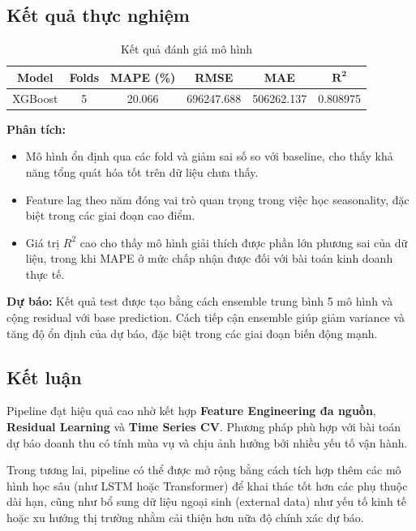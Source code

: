 \documentclass{article}
\begin{document}
\subsection{Kết quả thực nghiệm}

\begin{table}[h]
\centering
\renewcommand{\arraystretch}{1.3}
\setlength{\tabcolsep}{10pt}

\begin{tabular}{|c|c|c|c|c|c|}
\hline
\textbf{Model} & \textbf{ Folds } & \textbf{ MAPE (\%) } & \textbf{RMSE} & \textbf{MAE} & $\mathbf{R^2}$ \\
\hline
XGBoost & 5 & 20.066 & 696247.688 & 506262.137 & 0.808975 \\
\hline
\end{tabular}
\caption{Kết quả đánh giá mô hình}
\end{table}

\textbf{Phân tích:}
\begin{itemize}
    \item Mô hình ổn định qua các fold và giảm sai số so với baseline, cho thấy khả năng tổng quát hóa tốt trên dữ liệu chưa thấy.
    \item Feature lag theo năm đóng vai trò quan trọng trong việc học seasonality, đặc biệt trong các giai đoạn cao điểm.
    \item Giá trị $R^2$ cao cho thấy mô hình giải thích được phần lớn phương sai của dữ liệu, trong khi MAPE ở mức chấp nhận được đối với bài toán kinh doanh thực tế.
\end{itemize}

\textbf{Dự báo:} Kết quả test được tạo bằng cách ensemble trung bình 5 mô hình và cộng residual với base prediction. Cách tiếp cận ensemble giúp giảm variance và tăng độ ổn định của dự báo, đặc biệt trong các giai đoạn biến động mạnh.

\subsection{Kết luận}

Pipeline đạt hiệu quả cao nhờ kết hợp \textbf{Feature Engineering đa nguồn}, \textbf{Residual Learning} và \textbf{Time Series CV}. Phương pháp phù hợp với bài toán dự báo doanh thu có tính mùa vụ và chịu ảnh hưởng bởi nhiều yếu tố vận hành. 

Trong tương lai, pipeline có thể được mở rộng bằng cách tích hợp thêm các mô hình học sâu (như LSTM hoặc Transformer) để khai thác tốt hơn các phụ thuộc dài hạn, cũng như bổ sung dữ liệu ngoại sinh (external data) như yếu tố kinh tế hoặc xu hướng thị trường nhằm cải thiện hơn nữa độ chính xác dự báo.
\end{document}
